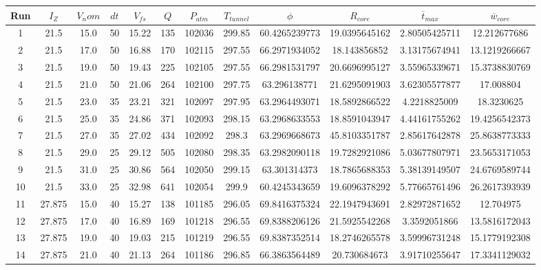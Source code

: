 \renewcommand\baselinestretch{1.3}\selectfont
\begin{table}[H]
\begin{center}
\begin{tabular}{|cccccccccccc|}
	\hline
	Run & $I_Z$ & $V_nom$ & $dt$ & $V_{fs}$ & $Q$ & $P_{atm}$ & $T_{tunnel}$ & $\phi$ & $R_{core}$ & $\overline{t}_{max}$ & $\overline{w}_{core}$\\
	\hline
	1 & 21.5 & 15.0 & 50 & 15.22 & 135 & 102036 & 299.85 & 60.4265239773 & 19.0395645162 & 2.80505425711 & 12.212677686\\
	2 & 21.5 & 17.0 & 50 & 16.88 & 170 & 102115 & 297.55 & 66.2971934052 & 18.143856852 & 3.13175674941 & 13.1219266667\\
	3 & 21.5 & 19.0 & 50 & 19.43 & 225 & 102105 & 297.55 & 66.2981531797 & 20.6696995127 & 3.55965339671 & 15.3738830769\\
	4 & 21.5 & 21.0 & 50 & 21.06 & 264 & 102100 & 297.75 & 63.296138771 & 21.6295091903 & 3.62305577877 & 17.008804\\
	5 & 21.5 & 23.0 & 35 & 23.21 & 321 & 102097 & 297.95 & 63.2964493071 & 18.5892866522 & 4.2218825009 & 18.3230625\\
	6 & 21.5 & 25.0 & 35 & 24.86 & 371 & 102093 & 298.15 & 63.2968633553 & 18.8591043947 & 4.44161755262 & 19.4256542373\\
	7 & 21.5 & 27.0 & 35 & 27.02 & 434 & 102092 & 298.3 & 63.2969668673 & 45.8103351787 & 2.85617642878 & 25.8638773333\\
	8 & 21.5 & 29.0 & 25 & 29.12 & 505 & 102080 & 298.35 & 63.2982090118 & 19.7282921086 & 5.03677807971 & 23.5653171053\\
	9 & 21.5 & 31.0 & 25 & 30.86 & 564 & 102050 & 299.15 & 63.301314373 & 18.7865688353 & 5.38139149507 & 24.6769589744\\
	10 & 21.5 & 33.0 & 25 & 32.98 & 641 & 102054 & 299.9 & 60.4245343659 & 19.6096378292 & 5.77665761496 & 26.2617393939\\
	11 & 27.875 & 15.0 & 40 & 15.27 & 138 & 101185 & 296.05 & 69.8416375324 & 22.1947943691 & 2.82972871652 & 12.704975\\
	12 & 27.875 & 17.0 & 40 & 16.89 & 169 & 101218 & 296.55 & 69.8388206126 & 21.5925542268 & 3.3592051866 & 13.5816172043\\
	13 & 27.875 & 19.0 & 40 & 19.03 & 215 & 101219 & 296.55 & 69.8387352514 & 18.2746265578 & 3.59996731248 & 15.1779192308\\
	14 & 27.875 & 21.0 & 40 & 21.13 & 264 & 101186 & 296.85 & 66.3863564489 & 20.730684673 & 3.91710255647 & 17.3341129032\\

\end{tabular}
\end{center}
\end{table}
